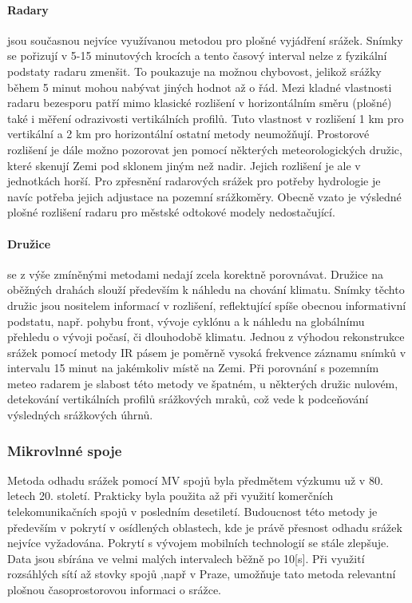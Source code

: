 \documentclass[a4paper,12pt]{article}
\begin{document}
\paragraph*{Radary}
jsou současnou nejvíce využívanou metodou pro plošné vyjádření srážek. Snímky se pořizují v 5-15 minutových krocích a tento časový interval nelze z fyzikální podstaty radaru zmenšit. To poukazuje na možnou chybovost, jelikož srážky během 5 minut mohou nabývat jiných hodnot až o řád. Mezi kladné vlastnosti radaru bezesporu patří mimo klasické rozlišení v horizontálním směru (plošné) také i měření odrazivosti vertikálních profilů. Tuto vlastnost v rozlišení 1 km pro vertikální a 2 km pro horizontální ostatní metody neumožňují. Prostorové rozlišení je dále možno pozorovat jen pomocí některých meteorologických družic, které skenují Zemi pod sklonem jiným než nadir. Jejich rozlišení je ale v jednotkách horší. Pro zpřesnění radarových srážek pro potřeby hydrologie je navíc potřeba jejich adjustace na pozemní srážkoměry. Obecně vzato je výsledné plošné rozlišení radaru pro městské odtokové modely nedostačující.   

\paragraph*{Družice} se z výše zmíněnými metodami nedají zcela korektně porovnávat. Družice na oběžných drahách slouží především k náhledu na chování klimatu. Snímky těchto družic jsou nositelem informací v rozlišení, reflektující spíše obecnou informativní podstatu, např. pohybu front, vývoje cyklónu a k náhledu na globálnímu přehledu o vývoji počasí, či dlouhodobě klimatu.
Jednou z výhodou rekonstrukce srážek pomocí metody \acs{IR} pásem je poměrně vysoká frekvence záznamu snímků v intervalu 15 minut na jakémkoliv místě na Zemi. Při porovnání s pozemním meteo radarem je slabost této metody ve špatném, u některých družic nulovém, detekování vertikálních profilů srážkových mraků, což vede k podceňování výsledných srážkových úhrnů.


\subsubsection{Mikrovlnné spoje}
Metoda odhadu srážek pomocí MV spojů byla předmětem výzkumu už v 80. letech 20. století. Prakticky byla použita až při využití komerčních telekomunikačních spojů v posledním desetiletí. Budoucnost této metody je především v pokrytí v osídlených oblastech, kde je právě přesnost odhadu srážek nejvíce vyžadována. Pokrytí s vývojem mobilních technologií se stále zlepšuje. Data jsou sbírána ve velmi malých intervalech běžně po 10[s]. Při využití rozsáhlých sítí až stovky spojů ,např v Praze, umožňuje tato metoda relevantní plošnou časoprostorovou informaci o srážce.
 
\end{document}

